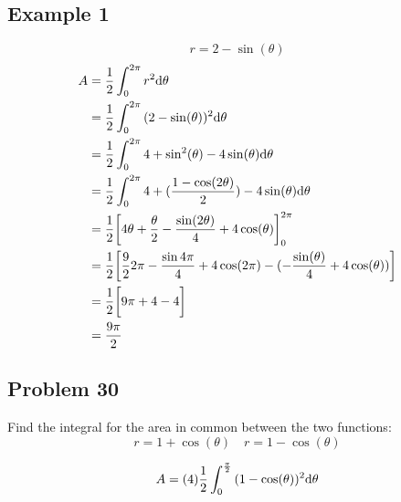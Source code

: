 \documentclass{math}
\begin{document}
\subsection*{Example 1}
\[ r = 2-\sin(\theta) \]
\begin{align*}
  A &= \frac{1}{2}\int_{0}^{2\pi}{r^{2}\mathrm{d}{\theta}} \\
  &= \frac{1}{2}\int_{0}^{2\pi}{(2-\sin(\theta))^{2}\mathrm{d}{\theta}} \\
  &= \frac{1}{2}\int_{0}^{2\pi}
    {4+\sin^{2}(\theta)-4\sin(\theta)\mathrm{d}{\theta}} \\
  &= \frac{1}{2}\int_{0}^{2\pi}
    {4+(\frac{1-\cos(2\theta)}{2})-4\sin(\theta)\mathrm{d}{\theta}} \\
  &= \frac{1}{2}\bigg[4\theta+\frac{\theta}{2}-
    \frac{\sin(2\theta)}{4}+4\cos(\theta)\bigg]_{0}^{2\pi} \\
  &= \frac{1}{2}\bigg[\frac{9}{2}{2\pi}-\frac{\sin{4\pi}}{4}+4\cos(2\pi)-
    (-\frac{\sin(\theta)}{4}+4\cos(\theta))\bigg] \\
  &= \frac{1}{2}\bigg[9\pi+4-4\bigg] \\
  &= \frac{9\pi}{2}
\end{align*}

\subsection*{Problem 30}
Find the integral for the area in common between the two functions:
\[ r = 1+\cos(\theta) \quad r = 1-\cos(\theta) \]
\begin{center}
\end{center}
\[ A = (4)\frac{1}{2}\int_{0}^{\frac{\pi}{2}}
   {(1-\cos(\theta))^{2}\mathrm{d}{\theta}} \]
\end{document}
